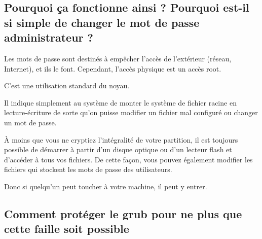 \documentclass[12pt,a4paper]{article}
\begin{document}
   \subsection{Pourquoi ça fonctionne ainsi ? Pourquoi est-il si simple de changer le mot de passe administrateur ?} 
   \begin{flushleft}
       \noindent Les mots de passe sont destinés à empêcher l'accès de l'extérieur (réseau, Internet), et ils le font. Cependant, l'accès physique est un accès root.
        \item C'est une utilisation standard du noyau.
        \item Il indique simplement au système de monter le système de fichier racine en lecture-écriture de sorte qu'on puisse modifier un fichier mal configuré ou changer un mot de passe.
       \item À moins que vous ne cryptiez l'intégralité de votre partition, il est toujours possible de démarrer à partir d'un disque optique ou d'un lecteur flash et d'accéder à tous vos fichiers. De cette façon, vous pouvez également modifier les fichiers qui stockent les mots de passe des utilisateurs.
       \item Donc si quelqu'un peut toucher à votre machine, il peut y entrer.
   \end{flushleft}

   \subsection{Comment protéger le grub pour ne plus que cette faille soit possible} 
\end{document}
